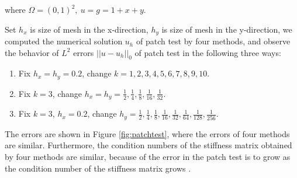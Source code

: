 \documentclass[10pt]{amsart}
\theoremstyle{definition}
\theoremstyle{remark}
\begin{document}
\begin{enumerate}[1.]
where $\Omega = (0, 1)^2, \ u = g = 1+x+y$. 

Set $h_x$ is size of mesh in the x-direction, $h_y$ is size of mesh in the
y-direction,
we computed the numerical solution $u_h$ of patch test by four methods, and
observe the behavior of $L^2$ errors $||u - u_h||_0$ of patch test in the
following three ways:
\begin{enumerate}[(1)]
\item Fix $h_x=h_y=0.2$, change $k= 1, 2, 3, 4, 5, 6, 7, 8, 9, 10$.
\item Fix $k=3$, change $h_x=h_y=\frac{1}{2}, \frac{1}{4}, \frac{1}{8},
     \frac{1}{16}, \frac{1}{32}$.
\item Fix $k=3$, $h_x=0.2$, change $h_y=\frac{1}{2}, \frac{1}{4}, \frac{1}{8},
    \frac{1}{16}, \frac{1}{32}, \frac{1}{64}, \frac{1}{128}, \frac{1}{256}$.
\end{enumerate}

The errors are shown in Figure \ref{fig:patchtest}, where 
the errors of four methods are similar. 
Furthermore, 
the condition numbers of the stiffness matrix obtained by
four methods are similar, because of the error in the patch test is to
grow as the condition number of the stiffness matrix grows
\cite{DassiMascotto2018}.


\end{enumerate}
\end{document}
